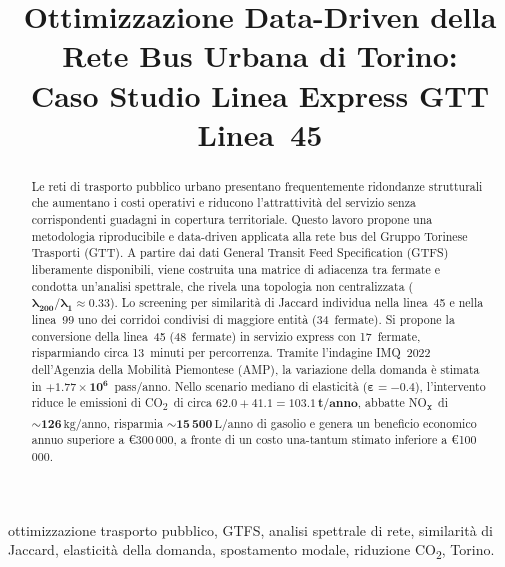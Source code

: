 \documentclass[conference]{IEEEtran}
\newcommand{\co}{CO\textsubscript{2}}
\newcommand{\nox}{NO\textsubscript{x}}
\begin{document}
\title{Ottimizzazione Data-Driven della Rete Bus Urbana di Torino:\\
       Caso Studio Linea Express GTT Linea~45}

\author{
}

\maketitle

\begin{abstract}
Le reti di trasporto pubblico urbano presentano frequentemente
ridondanze strutturali che aumentano i costi operativi e riducono
l'attrattività del servizio senza corrispondenti guadagni in
copertura territoriale. Questo lavoro propone una metodologia
riproducibile e data-driven applicata alla rete bus del Gruppo
Torinese Trasporti (GTT). A partire dai dati General Transit
Feed Specification (GTFS) liberamente disponibili, viene costruita
una matrice di adiacenza tra fermate e condotta un'analisi spettrale,
che rivela una topologia non centralizzata
($\bm{\lambda_{200}/\lambda_1 \approx 0.33}$). Lo screening per
similarità di Jaccard individua nella linea~45 e nella linea~99
uno dei corridoi condivisi di maggiore entità (34~fermate). Si propone
la conversione della linea~45 (48~fermate) in servizio express con
17~fermate, risparmiando circa 13~minuti per percorrenza. Tramite
l'indagine IMQ~2022 dell'Agenzia della Mobilità Piemontese (AMP),
la variazione della domanda è stimata in $+\bm{1.77 \times 10^6}$~pass/anno. Nello scenario mediano di elasticità ($\bm{\varepsilon = -0.4}$), l'intervento riduce le
emissioni di \co\ di circa $\bm{62.0 + 41.1 = 103.1\, \text{t/anno}}$,
abbatte \nox\ di $\bm{\sim126\,} \text{kg/anno}$, risparmia
$\bm{\sim15\,500}\, \text{L/anno}$ di gasolio e genera un beneficio economico
annuo superiore a \euro{}300\,000, a fronte di un costo una-tantum
stimato inferiore a \euro{}100\,000.
\end{abstract}

\begin{IEEEkeywords}
ottimizzazione trasporto pubblico, GTFS, analisi spettrale di rete,
similarità di Jaccard, elasticità della domanda, spostamento modale,
riduzione \co, Torino.
\end{IEEEkeywords}
\end{document}
